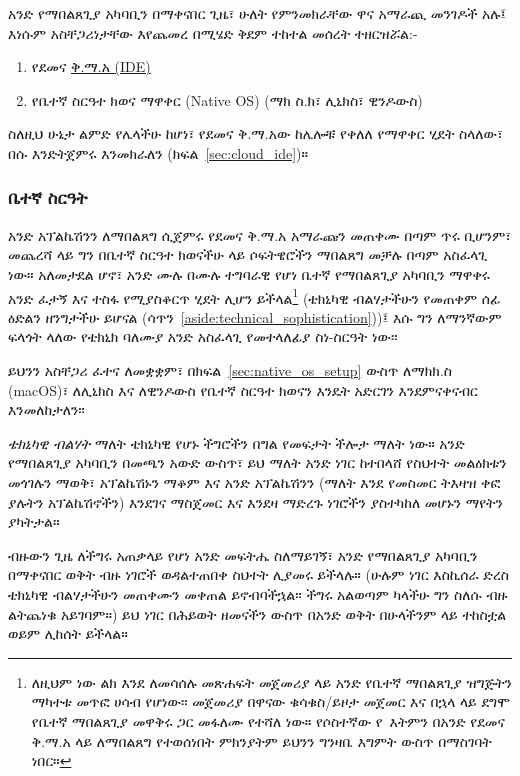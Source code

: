 አንድ የማበልጸጊያ አካባቢን በማቀናበር ጊዜ፣ ሁለት የምንመክራቸው ዋና አማራጪ መንገዶች አሉ፤ እነሱም አስቸጋሪነታቸው እየጨመረ በሚሄድ ቅደም ተከተል መሰረት ተዘርዝሯል:-

\begin{enumerate}
  \item የደመና \href{https://en.wikipedia.org/wiki/Integrated_development_environment}{ቅ.ማ.አ (IDE)}
  \item የቤተኛ ስርዓተ ክወና ማዋቀር (Native OS) (ማክ ስ.ክ፣ ሊኒክስ፣ ዊንዶውስ)
\end{enumerate}

ስለዚህ ሁኔታ ልምድ የሌላችሁ ከሆነ፣ የደመና ቅ.ማ.አው ከሌሎቹ የቀለለ የማዋቀር ሂደት ስላለው፣ በሱ እንድትጀምሩ እንመክራለን (ክፍል~\ref{sec:cloud_ide})።

\subsubsection{ቤተኛ ስርዓት} %
\label{sec:native_system}

አንድ አፕልኬሽንን ለማበልጸግ ሲጀምሩ የደመና ቅ.ማ.አ አማራጩን መጠቀሙ በጣም ጥሩ ቢሆንም፣
መጨረሻ ላይ ግን በቤተኛ ስርዓተ ክወናችሁ ላይ ሶፍትዌሮችን ማበልጸግ መቻሉ በጣም አስፈላጊ ነው።
አለመታደል ሆኖ፣ አንድ ሙሉ በሙሉ ተግባራዊ የሆነ ቤተኛ የማበልጸጊያ አካባቢን ማዋቀሩ አንድ ፈታኝ እና ተስፋ የሚያስቆርጥ ሂደት ሊሆን ይችላል\footnote{ለዚህም ነው ልክ እንደ \rortb ለመሳሰሉ መጽሐፍት መጀመሪያ ላይ አንድ የቤተኛ ማበልጸጊያ ዝግጅትን ማካተቱ መጥፎ ሀሳብ የሆነው፡፡ መጀመሪያ በዋናው ቁሳቁስ/ይዞታ መጀመር እና በኋላ ላይ ደግሞ የቤተኛ ማበልጸጊያ መዋቅሩ ጋር መፋለሙ የተሻለ ነው። የሶስተኛው የ\rortb\ እትምን በአንድ የደመና ቅ.ማ.አ ላይ ለማበልጸግ የተወሰነበት ምክንያትም ይህንን ግንዛቤ እግምት ውስጥ በማስገባት ነበር።} (ቴክኒካዊ ብልሃታችሁን የመጠቀም ሰፊ ዕድልን ዘንግታችሁ ይሆናል (ሳጥን~\ref{aside:technical_sophistication}))፤ እሱ ግን ለማንኛውም ፍላጎት ላለው የቴክኒክ ባለሙያ አንድ አስፈላጊ የመተላለፊያ ስነ-ስርዓት ነው፡፡

ይህንን አስቸጋሪ ፈተና ለመቋቋም፣ በክፍል~\ref{sec:native_os_setup} ውስጥ ለማክክ.ስ (macOS)፣ ለሊኒክስ እና ለዊንዶውስ የቤተኛ ስርዓተ ክወናን እንዴት አድርገን እንደምናቀናብር እንመለከታለን፡፡

\begin{aside}
\label{aside:technical_sophistication}

\emph{ቴክኒካዊ ብልሃት} ማለት ቴክኒካዊ የሆኑ ችግሮችን በግል የመፍታት ችሎታ ማለት ነው። አንድ የማበልጸጊያ አካባቢን በመጫን አውድ ውስጥ፣ ይህ ማለት አንድ ነገር ከተበላሸ የስህተት መልዕክቱን መጎገሉን ማወቅ፣ አፕልኬሽኑን ማቆም እና አንድ አፕልኬሽንን (ማለት እንደ የመስመር ትእዛዝ ቀፎ ያሉትን አፕልኬሽኖችን) እንደገና ማስጀመር እና እንደዛ ማድረጉ ነገሮችን ያስተካከለ መሆኑን ማየትን ያካትታል።

ብዙውን ጊዜ ለችግሩ አጠቃላይ የሆነ አንድ መፍትሔ ስለማይገኝ፣ አንድ የማበልጸጊያ አካባቢን በማቀናበር ወቅት ብዙ ነገሮች ወዳልተጠበቀ ስህተት ሊያመሩ ይችላሉ። (ሁሉም ነገር እስኪሰራ ድረስ ቴክኒካዊ ብልሃታችሁን መጠቀሙን መቀጠል ይኖብባችኋል፡፡ ችግሩ አልወጣም ካላችሁ ግን ስለሱ ብዙ ልትጨነቁ አይገባም።) ይህ ነገር በሕይወት ዘመናችን ውስጥ በአንድ ወቅት በሁላችንም ላይ ተከስቷል ወይም ሊከሰት ይችላል።

\end{aside}

